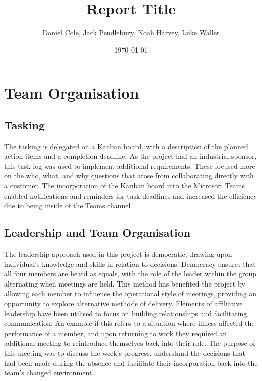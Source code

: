 \documentclass [12pt]{article}
\begin{document}
\title{\bf Report Title}
\author{Daniel Cole, Jack Pendlebury, Noah Harvey, Luke Waller}
\date{\today}
\maketitle
\thispagestyle{empty}

\newpage
{}
\setcounter{page}{1}
\tableofcontents
\newpage

\listoffigures
\listoftables

\newpage
\section{Team Organisation}\label{sec:Team_Organisation}

\subsection{Tasking}\label{sec:Tasking}

The tasking is delegated on a Kanban board, with a description of the planned action items and a completion deadline. As the project had an industrial sponsor, this task log was used to implement additional requirements. These focused more on the who, what, and why questions that arose from collaborating directly with a customer. The incorporation of the Kanban board into the Microsoft Teams enabled notifications and reminders for task deadlines and increased the efficiency due to being inside of the Teams channel.

\subsection{Leadership and Team Organisation}\label{sec:Leadership_and_Team_Organisation}

The leadership approach used in this project is democratic, drawing upon individual’s knowledge and skills in relation to decisions. Democracy ensures that all four members are heard as equals, with the role of the leader within the group alternating when meetings are held. This method has benefited the project by allowing each member to influence the operational style of meetings, providing an opportunity to explore alternative methods of delivery. Elements of affiliative leadership have been utilised to focus on building relationships and facilitating communication. An example if this refers to a situation where illness affected the performance of a member, and upon returning to work they required an additional meeting to reintroduce themselves back into their role. The purpose of this meeting was to discuss the week’s progress, understand the decisions that had been made during the absence and facilitate their incorporation back into the team’s changed environment.
\end{document}
